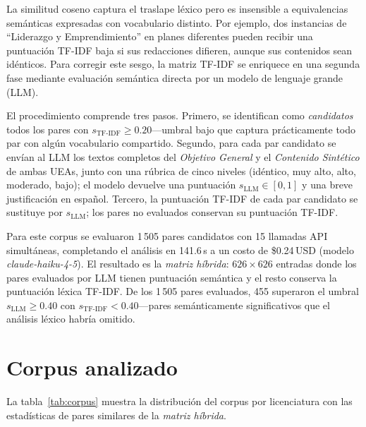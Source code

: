 \documentclass[11pt,a4paper]{article}
\begin{document}
La similitud coseno captura el traslape léxico pero es insensible a equivalencias semánticas expresadas con vocabulario distinto.
Por ejemplo, dos instancias de ``Liderazgo y Emprendimiento'' en planes diferentes pueden recibir una puntuación TF-IDF baja si sus redacciones difieren, aunque sus contenidos sean idénticos.
Para corregir este sesgo, la matriz TF-IDF se enriquece en una segunda fase mediante evaluación semántica directa por un modelo de lenguaje grande (LLM).

El procedimiento comprende tres pasos.
Primero, se identifican como \textit{candidatos} todos los pares con $s_{\mathrm{TF\text{-}IDF}} \geq 0.20$---umbral bajo que captura prácticamente todo par con algún vocabulario compartido.
Segundo, para cada par candidato se envían al LLM los textos completos del \textit{Objetivo General} y el \textit{Contenido Sintético} de ambas UEAs, junto con una rúbrica de cinco niveles (idéntico, muy alto, alto, moderado, bajo); el modelo devuelve una puntuación $s_{\mathrm{LLM}} \in [0,1]$ y una breve justificación en español.
Tercero, la puntuación TF-IDF de cada par candidato se sustituye por $s_{\mathrm{LLM}}$; los pares no evaluados conservan su puntuación TF-IDF.

Para este corpus se evaluaron 1\,505 pares candidatos con 15 llamadas API simultáneas, completando el análisis en 141.6\,s a un costo de \$0.24\,USD (modelo \textit{claude-haiku-4-5}).
El resultado es la \textit{matriz híbrida}: $626 \times 626$ entradas donde los pares evaluados por LLM tienen puntuación semántica y el resto conserva la puntuación léxica TF-IDF.
De los 1\,505 pares evaluados, 455 superaron el umbral $s_{\mathrm{LLM}} \geq 0.40$ con $s_{\mathrm{TF\text{-}IDF}} < 0.40$---pares semánticamente significativos que el análisis léxico habría omitido.

\section{Corpus analizado}

La tabla~\ref{tab:corpus} muestra la distribución del corpus por licenciatura con las estadísticas de pares similares de la \textit{matriz híbrida}.
\end{document}
